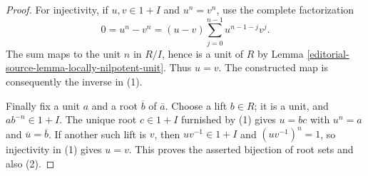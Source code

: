 \begin{proof}
\medskip\noindent
For injectivity, if $u,v\in1+I$ and $u^n=v^n$, use the complete
factorization
$$
0=u^n-v^n=(u-v)\sum_{j=0}^{n-1}u^{n-1-j}v^j.
$$
The sum maps to the unit $n$ in $R/I$, hence is a unit of $R$ by
Lemma \ref{editorial-source-lemma-locally-nilpotent-unit}. Thus $u=v$.
The constructed map is consequently the inverse in (1).

\medskip\noindent
Finally fix a unit $a$ and a root $\overline b$ of $\overline a$.
Choose a lift $b\in R$; it is a unit, and $ab^{-n}\in1+I$.
The unique root $c\in1+I$ furnished by (1) gives $u=bc$ with
$u^n=a$ and $\overline u=\overline b$.
If another such lift is $v$, then $uv^{-1}\in1+I$ and
$(uv^{-1})^n=1$, so injectivity in (1) gives $u=v$.
This proves the asserted bijection of root sets and also (2).
\end{proof}